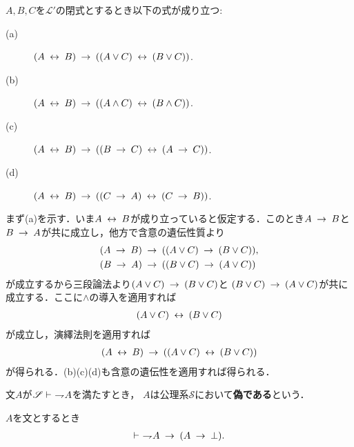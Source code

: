 	\begin{screen}
		\begin{logicalthm}[同値記号の遺伝性質]\label{logicalthm:hereditary_of_equivalence}
			$A,B,C$を$\mathcal{L}'$の閉式とするとき以下の式が成り立つ:
			\begin{description}
				\item[(a)] $(A \lrarrow B) \rarrow ((A \vee C) \lrarrow (B \vee C))$.
				\item[(b)] $(A \lrarrow B) \rarrow ((A \wedge C) \lrarrow (B \wedge C))$.
				\item[(c)] $(A \lrarrow B) \rarrow ((B \rarrow C) \lrarrow (A \rarrow C))$.
				
				\item[(d)] $(A \lrarrow B) \rarrow ((C \rarrow A) \lrarrow (C \rarrow B))$.
			\end{description}
		\end{logicalthm}
	\end{screen}
	
	\begin{prf}
		まず(a)を示す．いま$A \lrarrow B$が成り立っていると仮定する．このとき$A \rarrow B$と
		$B \rarrow A$が共に成立し，他方で含意の遺伝性質より
		\begin{align}
			&(A \rarrow B) \rarrow ((A \vee C) \rarrow (B \vee C)), \\
			&(B \rarrow A) \rarrow ((B \vee C) \rarrow (A \vee C))
		\end{align}
		が成立するから三段論法より$(A \vee C) \rarrow (B \vee C)$と
		$(B \vee C) \rarrow (A \vee C)$が共に成立する．ここに$\wedge$の導入を適用すれば
		\begin{align}
			(A \vee C) \lrarrow (B \vee C)
		\end{align}
		が成立し，演繹法則を適用すれば
		\begin{align}
			(A \lrarrow B) \rarrow ((A \vee C) \lrarrow (B \vee C))
		\end{align}
		が得られる．(b)(c)(d)も含意の遺伝性を適用すれば得られる．
		\QED
	\end{prf}
	
	文$A$が$\mathscr{S} \vdash\ \negation A$を満たすとき，
	$A$は公理系$\mathscr{S}$において{\bf 偽である}という．
	
	\begin{screen}
		\begin{logicalthm}[偽な式は矛盾を導く]\label{logicalthm:false_and_negation_are_equivalent}
			$A$を文とするとき
			\begin{align}
				\vdash\ \negation A \rarrow (A \rarrow \bot).
			\end{align}
		\end{logicalthm}
	\end{screen}
	
